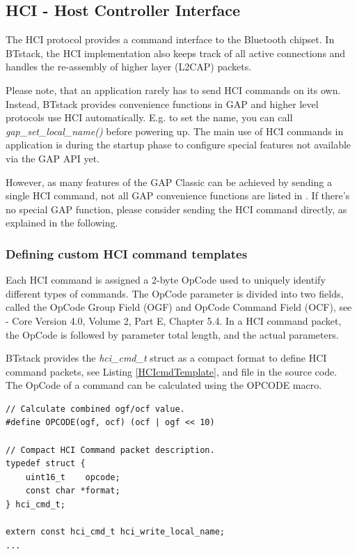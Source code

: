\subsection{HCI - Host Controller Interface}

The HCI protocol provides a command interface to the Bluetooth chipset. In BTstack, the HCI implementation also keeps track of all active connections and handles the re-assembly of higher layer (L2CAP) packets. 

Please note, that an application rarely has to send HCI commands on its own. Instead, BTstack provides convenience functions in GAP and higher level protocols use HCI automatically. E.g. to set the name, you can call \emph{gap\_set\_local\_name()} before powering up. The main use of HCI commands in application is during the startup phase to configure special features not available via the GAP API yet.

However, as many features of the GAP Classic can be achieved by sending a single HCI command, not all GAP convenience functions are listed in . If there's no special GAP function, please consider sending the HCI command directly, as explained in the following. 

\subsubsection{Defining custom HCI command templates}

Each HCI command is assigned a 2-byte OpCode used to uniquely identify different types of commands. The OpCode parameter is divided into two fields, called the OpCode Group Field (OGF) and OpCode Command Field (OCF), see \BluetoothSpecification{} - Core Version 4.0, Volume 2, Part E, Chapter 5.4. In a HCI command packet, the OpCode is followed by parameter total length, and the actual parameters.

BTstack provides the \emph{hci\_cmd\_t} struct as a compact format to define HCI command packets, see Listing \ref{HCIcmdTemplate},  and  file in the source code. The OpCode of a command can be calculated using the OPCODE macro. 


\noindent\begin{minipage}{\textwidth}
\begin{lstlisting}[caption = hci\_cmds.h defines HCI command template., label=HCIcmdTemplate]
// Calculate combined ogf/ocf value.
#define OPCODE(ogf, ocf) (ocf | ogf << 10)

// Compact HCI Command packet description.
typedef struct {
    uint16_t    opcode;
    const char *format;
} hci_cmd_t;

extern const hci_cmd_t hci_write_local_name;
...
\end{lstlisting}
\end{minipage}

